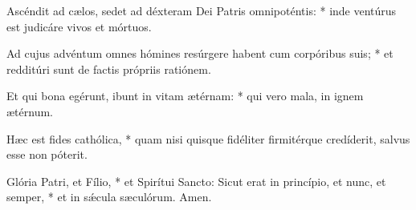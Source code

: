 {Ascéndit ad c{\ae}los, sedet ad déxteram Dei Patris omnipoténtis: * inde ventúrus est judicáre vivos et mórtuos.\par
Ad cujus advéntum omnes hómines resúrgere habent cum corpóribus suis; * et redditúri sunt de factis própriis ratiónem.\par
Et qui bona egérunt, ibunt in vitam {\ae}térnam: * qui vero mala, in ignem {\ae}térnum.
\par
H{\ae}c est fides cathólica, * quam nisi quisque fidéliter firmitérque credíderit, salvus esse non póterit.\par
\par
Glória Patri, et Fílio, * et Spirítui Sancto: Sicut erat in princípio, et nunc, et semper, * et in sǽcula s{\ae}culórum. Amen.
}
